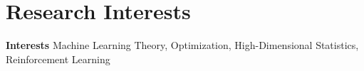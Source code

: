 \section{Research Interests}
\small
\textbf{Interests} \quad Machine Learning Theory, Optimization, High-Dimensional Statistics, Reinforcement Learning
\normalsize
